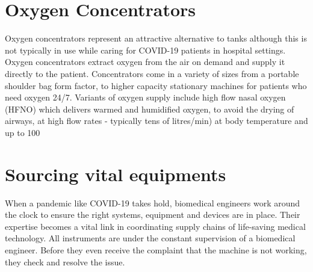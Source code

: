 \documentclass[12pt]{article}
\begin{document}
\section{Oxygen Concentrators}
Oxygen concentrators represent an attractive alternative to tanks although this is not typically in use while caring for COVID-19 patients in hospital settings. Oxygen concentrators extract oxygen from the air on demand and supply it directly to the patient. Concentrators come in a variety of sizes from a portable shoulder bag form factor, to higher capacity stationary machines for patients who need oxygen 24/7.\newline
Variants of oxygen supply include high flow nasal oxygen (HFNO) which delivers warmed and humidified oxygen, to avoid the drying of airways, at high flow rates - typically tens of litres/min) at body temperature and up to 100%

\section{Sourcing vital equipments}

When a pandemic like COVID-19 takes hold, biomedical engineers work around the clock to ensure the right systems, equipment and devices are in place. Their expertise becomes a vital link in coordinating supply chains of life-saving medical technology.\newline
 All instruments are under the constant supervision of a biomedical engineer. Before they even receive the complaint that the machine is not working, they check and resolve the issue.
\end{document}
